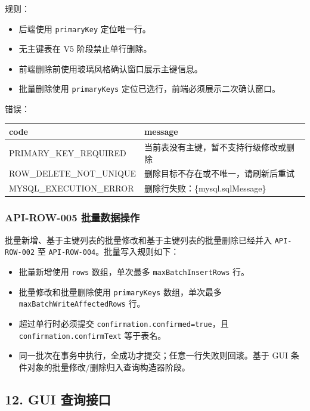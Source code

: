\documentclass[
  a4paper,
  UTF8]{ctexart}
\providecommand{\tightlist}{%
  \setlength{\itemsep}{0pt}\setlength{\parskip}{0pt}}
\begin{document}
规则：

\begin{itemize}
\tightlist
\item
  后端使用 \texttt{primaryKey} 定位唯一行。
\item
  无主键表在 V5 阶段禁止单行删除。
\item
  前端删除前使用玻璃风格确认窗口展示主键信息。
\item
  批量删除使用 \texttt{primaryKeys}
  定位已选行，前端必须展示二次确认窗口。
\end{itemize}

错误：

\begin{longtable}[]{@{}ll@{}}
\toprule
code & message \\
\midrule
\endhead
PRIMARY\_KEY\_REQUIRED & 当前表没有主键，暂不支持行级修改或删除 \\
ROW\_DELETE\_NOT\_UNIQUE & 删除目标不存在或不唯一，请刷新后重试 \\
MYSQL\_EXECUTION\_ERROR & 删除行失败：\{mysql.sqlMessage\} \\
\bottomrule
\end{longtable}

\hypertarget{api-row-005-ux6279ux91cfux6570ux636eux64cdux4f5c}{%
\subsubsection{API-ROW-005
批量数据操作}\label{api-row-005-ux6279ux91cfux6570ux636eux64cdux4f5c}}

批量新增、基于主键列表的批量修改和基于主键列表的批量删除已经并入
\texttt{API-ROW-002} 至 \texttt{API-ROW-004}。批量写入规则如下：

\begin{itemize}
\tightlist
\item
  批量新增使用 \texttt{rows} 数组，单次最多 \texttt{maxBatchInsertRows}
  行。
\item
  批量修改和批量删除使用 \texttt{primaryKeys} 数组，单次最多
  \texttt{maxBatchWriteAffectedRows} 行。
\item
  超过单行时必须提交 \texttt{confirmation.confirmed=true}，且
  \texttt{confirmation.confirmText} 等于表名。
\item
  同一批次在事务中执行，全成功才提交；任意一行失败则回滚。基于 GUI
  条件对象的批量修改/删除归入查询构造器阶段。
\end{itemize}

\hypertarget{gui-ux67e5ux8be2ux63a5ux53e3}{%
\subsection{12. GUI 查询接口}\label{gui-ux67e5ux8be2ux63a5ux53e3}}
\end{document}
